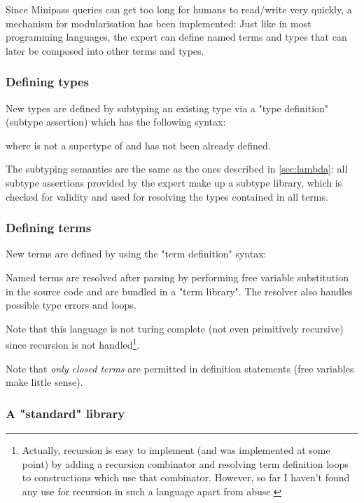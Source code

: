 \documentclass[main.tex]{subfiles}
\begin{document}
Since Minipass queries can get too long for humans to read/write very quickly,
a mechanism for modularisation has been implemented: Just like in most
programming languages, the expert can define
named terms and types that can later be composed into other terms and types.

\subsubsection{Defining types}
New types are defined by subtyping an existing type via a "type definition"
(subtype assertion) which has the following syntax:
\begin{center}
\end{center}
where  is not a supertype of  and has not been
already defined.

The subtyping semantics
are the same as the ones described in \cref{sec:lambda}: all subtype assertions
provided by the expert
make up a subtype library, which is checked for validity and used for resolving
the types contained in all terms.

\subsubsection{Defining terms}
New terms are defined by using the "term definition" syntax:
\begin{center}
\end{center}

Named terms are resolved after parsing by performing free variable substitution
in the source code and are bundled in a "term library". The resolver also
handles possible type errors and loops.

Note that this language is not turing complete (not even primitively recursive)
since recursion is not handled\footnote{
    Actually, recursion is easy to implement (and was implemented at some point)
    by adding a recursion combinator
    and resolving term definition loops to constructions which use that combinator.
    However, so far I haven't found any use for recursion in such a language
    apart from abuse.
}.

Note that \emph{only closed terms} are permitted in definition statements
(free variables make little sense).

\subsubsection{A "standard" library}
\label{stdlib}
\end{document}
